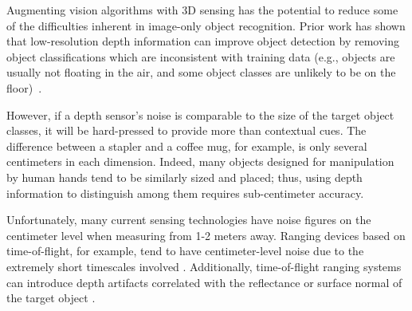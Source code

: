 \documentclass[letterpaper, 10 pt, conference]{ieeeconf}  %
\begin{document}

Augmenting vision algorithms with 3D sensing has the potential to reduce some
of the difficulties inherent in image-only object recognition. Prior work has
shown that low-resolution depth information can improve object detection by
removing object classifications which are inconsistent with training data
(e.g., objects are usually not floating in the air, and some object classes are
unlikely to be on the floor)~\cite{bib:eccv}.

However, if a depth sensor's noise is comparable to the size of the target
object classes, it will be hard-pressed to provide more than contextual
cues. The difference between a stapler and a coffee mug, for example, is
only several centimeters in each dimension. Indeed, many objects designed for
manipulation by human hands tend to be similarly sized and placed; thus, using
depth information to distinguish among them requires sub-centimeter
accuracy.


Unfortunately, many current sensing technologies have noise figures on the
centimeter level when measuring from 1-2 meters away. Ranging devices based
on time-of-flight, for example, tend to have centimeter-level noise due to the
extremely short timescales involved \cite{bib:3d-cam-iros06}. Additionally,
time-of-flight ranging systems can introduce depth artifacts correlated with
the reflectance or surface normal of the target object
\cite{bib:noise-of-3d-cams}.
\end{document}
